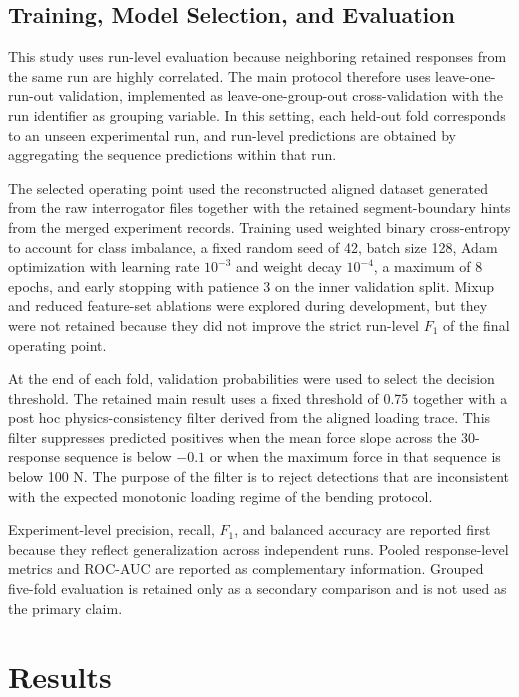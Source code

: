 \documentclass[notspecified,article,submit,pdftex,moreauthors]{Definitions/mdpi}
\begin{document}
\subsection{Training, Model Selection, and Evaluation}

This study uses run-level evaluation because neighboring retained responses from the same run are highly correlated. The main protocol therefore uses leave-one-run-out validation, implemented as leave-one-group-out cross-validation with the run identifier as grouping variable. In this setting, each held-out fold corresponds to an unseen experimental run, and run-level predictions are obtained by aggregating the sequence predictions within that run.

The selected operating point used the reconstructed aligned dataset generated from the raw interrogator files together with the retained segment-boundary hints from the merged experiment records. Training used weighted binary cross-entropy to account for class imbalance, a fixed random seed of 42, batch size 128, Adam optimization with learning rate $10^{-3}$ and weight decay $10^{-4}$, a maximum of 8 epochs, and early stopping with patience 3 on the inner validation split. Mixup and reduced feature-set ablations were explored during development, but they were not retained because they did not improve the strict run-level $F_1$ of the final operating point.

At the end of each fold, validation probabilities were used to select the decision threshold. The retained main result uses a fixed threshold of 0.75 together with a post hoc physics-consistency filter derived from the aligned loading trace. This filter suppresses predicted positives when the mean force slope across the 30-response sequence is below $-0.1$ or when the maximum force in that sequence is below 100 N. The purpose of the filter is to reject detections that are inconsistent with the expected monotonic loading regime of the bending protocol.

Experiment-level precision, recall, $F_1$, and balanced accuracy are reported first because they reflect generalization across independent runs. Pooled response-level metrics and ROC-AUC are reported as complementary information. Grouped five-fold evaluation is retained only as a secondary comparison and is not used as the primary claim.

\section{Results}
\end{document}
